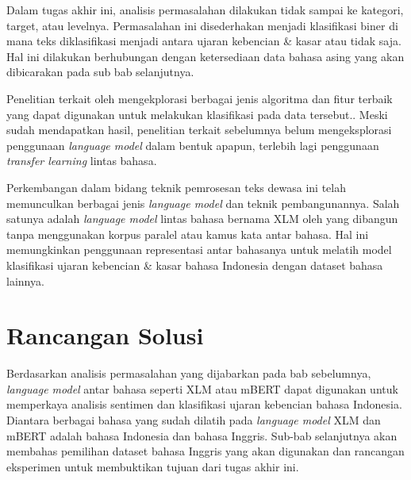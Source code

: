 	Dalam tugas akhir ini, analisis permasalahan dilakukan tidak sampai ke kategori, target, atau levelnya. Permasalahan ini disederhakan menjadi klasifikasi biner di mana teks diklasifikasi menjadi antara ujaran kebencian \& kasar atau tidak saja. Hal ini dilakukan berhubungan dengan ketersediaan data bahasa asing yang akan dibicarakan pada sub bab selanjutnya.

	Penelitian terkait oleh \parencite{Ibrohim_Budi_2019} mengekplorasi berbagai jenis algoritma dan fitur terbaik yang dapat digunakan untuk melakukan klasifikasi pada data tersebut.. Meski sudah mendapatkan hasil, penelitian terkait sebelumnya belum mengeksplorasi penggunaan \textit{language model} dalam bentuk apapun, terlebih lagi penggunaan \textit{transfer learning} lintas bahasa.

	Perkembangan dalam bidang teknik pemrosesan teks dewasa ini telah memunculkan berbagai jenis \textit{language model} dan teknik pembangunannya. Salah satunya adalah \textit{language model} lintas bahasa bernama XLM oleh \parencite{LampleConneau2019} yang dibangun tanpa menggunakan korpus paralel atau kamus kata antar bahasa. Hal ini memungkinkan penggunaan representasi antar bahasanya untuk melatih model klasifikasi ujaran kebencian \& kasar bahasa Indonesia dengan dataset bahasa lainnya.






\section{Rancangan Solusi}
	Berdasarkan analisis permasalahan yang dijabarkan pada bab sebelumnya, \textit{language model} antar bahasa seperti XLM atau mBERT dapat digunakan untuk memperkaya analisis sentimen dan klasifikasi ujaran kebencian bahasa Indonesia. Diantara berbagai bahasa yang sudah dilatih pada \textit{language model} XLM dan mBERT adalah bahasa Indonesia dan bahasa Inggris. Sub-bab selanjutnya akan membahas pemilihan dataset bahasa Inggris yang akan digunakan dan rancangan eksperimen untuk membuktikan tujuan dari tugas akhir ini.

